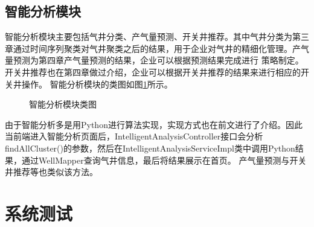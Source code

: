 \subsection{智能分析模块}
智能分析模块主要包括气井分类、产气量预测、开关井推荐。其中气井分类为第三章通过时间序列聚类对气井聚类之后的结果，用于企业对气井的精细化管理。产气量预测为第四章产气量预测的结果，企业可以根据预测结果完成进行
策略制定。开关井推荐也在第四章做过介绍，企业可以根据开关井推荐的结果来进行相应的开关井操作。
智能分析模块的类图如图\ref{fig:analyclass}所示。
\begin{figure}[H]
    \centering
    \caption{智能分析模块类图}
    \label{fig:analyclass}
\end{figure}
由于智能分析多是用Python进行算法实现，实现方式也在前文进行了介绍。因此当前端进入智能分析页面后，IntelligentAnalysisController接口会分析findAllCluster()的参数，然后在IntelligentAnalysisServiceImpl类中调用Python结果，通过WellMapper查询气井信息，最后将结果展示在首页。
产气量预测与开关井推荐等也类似该方法。
\section{系统测试}
